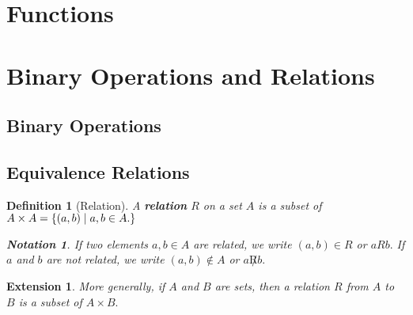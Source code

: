 \documentclass[12pt,a4paper]{article}
\newtheorem{nota}{Notation}[section]
\newtheorem{df}{Definition}[subsection]
\newtheorem*{ext}{\indent Extension}
\begin{document}
\newpage
\section{Functions}


\newpage
\section{Binary Operations and Relations}
\subsection{Binary Operations}
\subsection{Equivalence Relations}
\begin{df}[Relation]
	A \textbf{relation} $R$	 on a set $A$ is a subset of $A\times A=\qty{\qty(a,b)\mid a,b\in A.}$ 
\begin{nota}
	If two elements $a,b\in A$ are related, we write $(a,b)\in R$ or $aRb.$ If $a$ and $b$ are not related, we write $(a,b)\notin A$ or $a\not Rb.$
\end{nota}
\end{df}
\begin{ext} More generally, if $A$ and $B$ are sets, then a relation $R$ from $A$ to $B$ is a subset of $A\times B.$\end{ext}
\end{document}

